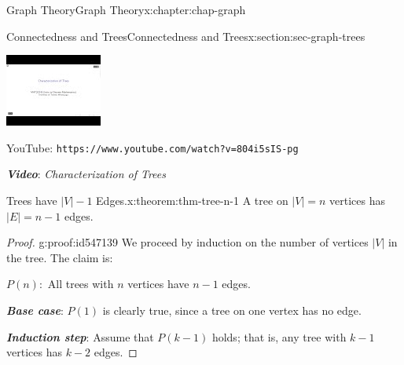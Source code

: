 \documentclass[oneside,10pt,]{book}
\newcommand{\mono}[1]{\texttt{#1}}
\newcommand{\alert}[1]{\textbf{\textit{#1}}}
\numberwithin{equation}{section}
\newlength{\qrsize}
\newlength{\previewwidth}
\begin{document}
\begin{chapterptx}{Graph Theory}{}{Graph Theory}{}{}{x:chapter:chap-graph}
\begin{sectionptx}{Connectedness and Trees}{}{Connectedness and Trees}{}{}{x:section:sec-graph-trees}
\begin{sidebyside}{1}{0}{0}{0}
\begin{sbspanel}{1}
\begin{tcbraster}[raster columns=2, raster column skip=1pt, raster halign=center, raster force size=false, raster left skip=0pt, raster right skip=0pt]
\begin{tcolorbox}[previewstyle, width=\previewwidth]
\includegraphics[width=0.80\linewidth,height=\qrsize,keepaspectratio]{images/video-char-trees.jpg}%
\end{tcolorbox}%
\begin{tcolorbox}[qrstyle]%
{\hypersetup{urlcolor=black}}%
\end{tcolorbox}%
\begin{tcolorbox}[captionstyle]%
\small YouTube: \mono{https://www.youtube.com/watch?v=804i5sIS-pg}\end{tcolorbox}%
\end{tcbraster}%
\end{sbspanel}%
\end{sidebyside}%
\par
\alert{Video}: \emph{Characterization of Trees}%
\begin{theorem}{Trees have \(|V|-1\) Edges.}{}{x:theorem:thm-tree-n-1}%
A tree on \(|V| = n\) vertices has \(|E| = n-1\) edges.%
\end{theorem}
\begin{proof}{}{g:proof:id547139}
We proceed by induction on the number of vertices \(|V|\) in the tree. The claim is:%
\begin{sidebyside}{1}{0.125}{0.125}{0}%
\begin{sbspanel}{0.75}%
\(P(n):\) All trees with \(n\) vertices have \(n-1\) edges.%
\end{sbspanel}%
\end{sidebyside}%
\par
\alert{Base case}: \(P(1)\) is clearly true, since a tree on one vertex has no edge.%
\par
\alert{Induction step}: Assume that \(P(k-1)\) holds; that is, any tree with \(k-1\) vertices has \(k-2\) edges.%
\par

\end{proof}
\end{sectionptx}
\end{chapterptx}
\end{document}
